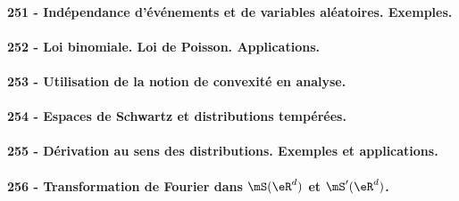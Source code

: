 \paragraph{251 - Indépendance d’événements et de variables aléatoires. Exemples.}
\paragraph{252 - Loi binomiale. Loi de Poisson. Applications.}
\paragraph{253 - Utilisation de la notion de convexité en analyse.}
\paragraph{254 - Espaces de Schwartz et distributions tempérées.}
\paragraph{255 - Dérivation au sens des distributions. Exemples et applications.}
\paragraph{256 - Transformation de Fourier dans \( \mS(\eR^d)\) et \( \mS'(\eR^d)\).}
